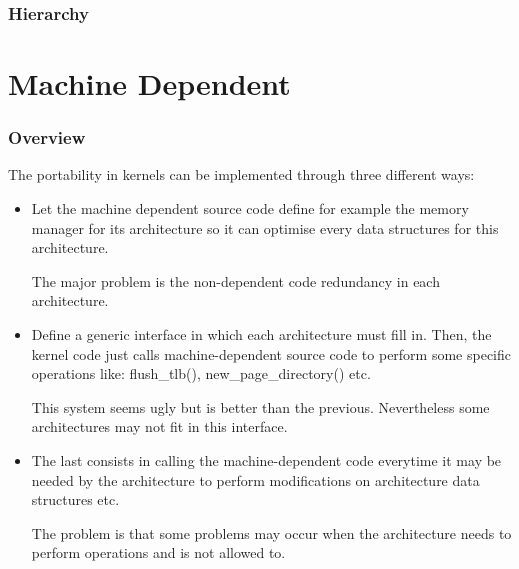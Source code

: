 
\begin{frame}
  \frametitle{Hierarchy}

  \begin{center}
  \end{center}
\end{frame}

%
%

\section{Machine Dependent}


\begin{frame}
  \frametitle{Overview}

  The portability in kernels can be implemented through three different
  ways:

  \begin{itemize}[<+->]
    \item
      Let the machine dependent source code define for example the memory
      manager for its architecture so it can optimise every data structures
      for this architecture.

      \-

      The major problem is the non-dependent code redundancy
      in each architecture.
    \item
      Define a generic interface in which each architecture must fill in.
      Then, the kernel code just calls machine-dependent source code
      to perform some specific operations like: flush\_tlb(),
      new\_page\_directory() etc.

      \-

      This system seems ugly but is better than the previous. Nevertheless
      some architectures may not fit in this interface.
    \item
      The last consists in calling the machine-dependent code everytime
      it may be needed by the architecture to perform modifications on
      architecture data structures etc.

      \-

      The problem is that some problems may occur when the architecture
      needs to perform operations and is not allowed to.
  \end{itemize}
\end{frame}


